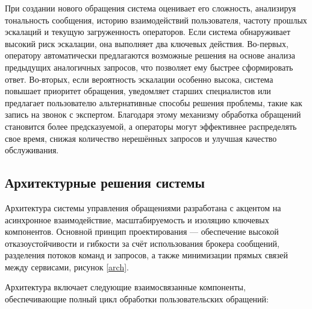 
При создании нового обращения система оценивает его сложность, анализируя тональность сообщения, историю взаимодействий пользователя, частоту прошлых эскалаций и текущую загруженность операторов. Если система обнаруживает высокий риск эскалации, она выполняет два ключевых действия. Во-первых, оператору автоматически предлагаются возможные решения на основе анализа предыдущих аналогичных запросов, что позволяет ему быстрее сформировать ответ. Во-вторых, если вероятность эскалации особенно высока, система повышает приоритет обращения, уведомляет старших специалистов или предлагает пользователю альтернативные способы решения проблемы, такие как запись на звонок с экспертом. Благодаря этому механизму обработка обращений становится более предсказуемой, а операторы могут эффективнее распределять свое время, снижая количество нерешённых запросов и улучшая качество обслуживания.

\subsection{Архитектурные решения системы}

Архитектура системы управления обращениями разработана с акцентом на асинхронное взаимодействие, масштабируемость и изоляцию ключевых компонентов. Основной принцип проектирования — обеспечение высокой отказоустойчивости и гибкости за счёт использования брокера сообщений, разделения потоков команд и запросов, а также минимизации прямых связей между сервисами, рисунок \ref{arch}.


Архитектура включает следующие взаимосвязанные компоненты, обеспечивающие полный цикл обработки пользовательских обращений:

